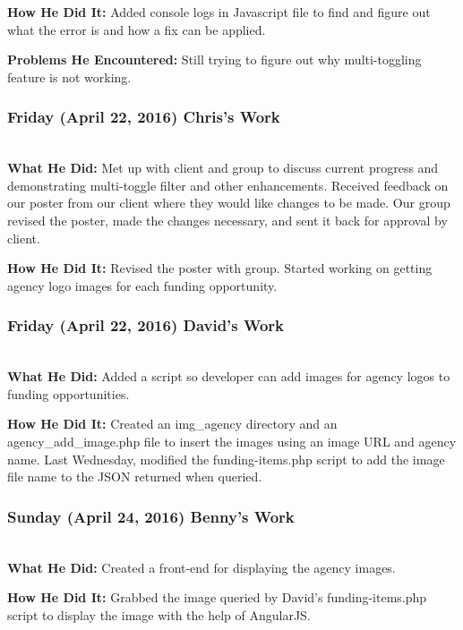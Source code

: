 \documentclass[onecolumn]{IEEEtran}
\begin{document}
	\textbf{How He Did It: }
	Added console logs in Javascript file to find and figure out what the error is and how a fix can be applied. 
    
	\textbf{Problems He Encountered: }
	Still trying to figure out why multi-toggling feature is not working. 

\subsubsection{Friday (April 22, 2016) Chris's Work  } \hspace*{\fill} \\
    \textbf{What He Did: } 
    Met up with client and group to discuss current progress and demonstrating multi-toggle filter and other enhancements. Received feedback on our poster from our client where they would like changes to be made. Our group revised the poster, made the changes necessary, and sent it back for approval by client. 
    
	\textbf{How He Did It: }
	Revised the poster with group. Started working on getting agency logo images for each funding opportunity. 

\subsubsection{Friday (April 22, 2016) David's Work  } \hspace*{\fill} \\
    \textbf{What He Did: } 
    Added a script so developer can add images for agency logos to funding opportunities.  
    
	\textbf{How He Did It: }
	Created an img\_agency directory and an agency\_add\_image.php file to insert the images using an image URL and agency name. Last Wednesday, modified the funding-items.php script to add the image file name to the JSON returned when queried. 

\subsubsection{Sunday (April 24, 2016) Benny's Work  } \hspace*{\fill} \\
    \textbf{What He Did: } 
    Created a front-end for displaying the agency images. 
    
	\textbf{How He Did It: }
	Grabbed the image queried by David's funding-items.php script to display the image with the help of AngularJS. 
    
\end{document}
